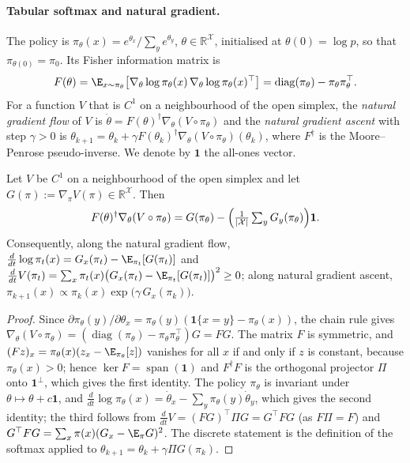 \paragraph{Tabular softmax and natural gradient.}
The policy is $\pi_\theta(x)=e^{\theta_x}/\sum_{y}e^{\theta_y}$,
$\theta\in\mathbb R^{\mathcal X}$, initialised at $\theta(0)=\log p$, so
that $\pi_{\theta(0)}=\pi_0$. Its Fisher information matrix is
\[
F(\theta)=\E_{x\sim\pi_\theta}\bigl[\nabla_\theta\log\pi_\theta(x)\,
\nabla_\theta\log\pi_\theta(x)^{\top}\bigr]
=\operatorname{diag}(\pi_\theta)-\pi_\theta\pi_\theta^{\top}.
\]
For a
function $V$ that is $C^1$ on a neighbourhood of the open simplex, the
\emph{natural gradient flow} of $V$ is
$\dot\theta=F(\theta)^{\dagger}\nabla_\theta (V\circ\pi_\theta)$ and the
\emph{natural gradient ascent} with step $\gamma>0$ is
$\theta_{k+1}=\theta_k+\gamma F(\theta_k)^{\dagger}\nabla_\theta
(V\circ\pi_{\theta})(\theta_k)$, where $F^\dagger$ is the Moore--Penrose
pseudo-inverse. We denote by $\mathbf 1$ the all-ones vector.

\begin{lemma}
\label{lem:npg-softmax}
Let $V$ be $C^1$ on a neighbourhood of the open simplex and let
$G(\pi):=\nabla_\pi V(\pi)\in\mathbb R^{\mathcal X}$. Then
\[
F(\theta)^{\dagger}\nabla_\theta (V\circ\pi_\theta)
= G(\pi_\theta)-\Bigl(\tfrac{1}{|\mathcal X|}\textstyle\sum_y G_y(\pi_\theta)\Bigr)\mathbf 1 .
\]
Consequently, along the natural gradient flow,
$\frac{d}{dt}\log\pi_t(x)=G_x(\pi_t)-\E_{\pi_t}[G(\pi_t)]$ and
$\frac{d}{dt}V(\pi_t)=\sum_x\pi_t(x)\bigl(G_x(\pi_t)-\E_{\pi_t}[G(\pi_t)]\bigr)^2\ge 0$;
along natural gradient ascent,
$\pi_{k+1}(x)\propto\pi_k(x)\exp\bigl(\gamma\,G_x(\pi_k)\bigr)$.
\end{lemma}

\begin{proof}
Since $\partial\pi_\theta(y)/\partial\theta_x=\pi_\theta(y)(\mathbf 1\{x=y\}-\pi_\theta(x))$,
the chain rule gives
$\nabla_\theta(V\circ\pi_\theta)=(\operatorname{diag}(\pi_\theta)-\pi_\theta\pi_\theta^\top)G=F G$.
The matrix $F$ is symmetric, and $(Fz)_x=\pi_\theta(x)(z_x-\E_{\pi_\theta}[z])$
vanishes for all $x$ if and only if $z$ is constant, because $\pi_\theta(x)>0$;
hence $\ker F=\operatorname{span}(\mathbf 1)$ and $F^\dagger F$ is the
orthogonal projector $\Pi$ onto $\mathbf 1^{\perp}$, which gives the first
identity. The policy $\pi_\theta$ is invariant under
$\theta\mapsto\theta+c\mathbf 1$, and
$\frac{d}{dt}\log\pi_\theta(x)=\dot\theta_x-\sum_y\pi_\theta(y)\dot\theta_y$,
which gives the second identity; the third follows from
$\frac{d}{dt}V=(FG)^\top\Pi G=G^\top F G$ (as $F\Pi=F$) and
$G^\top FG=\sum_x\pi(x)(G_x-\E_\pi G)^2$. The discrete statement is the
definition of the softmax applied to $\theta_{k+1}=\theta_k+\gamma\Pi G(\pi_k)$.
\end{proof}

